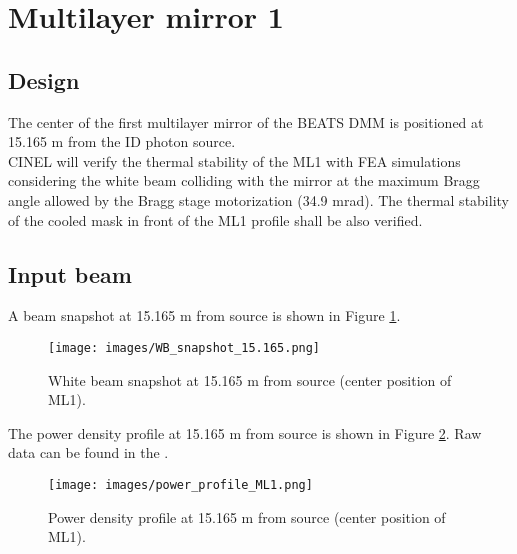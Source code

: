 \section{Multilayer mirror 1}
\subsection{Design}
The center of the first multilayer mirror of the BEATS DMM is positioned at 15.165 m from the ID photon source. \\
CINEL will verify the thermal stability of the ML1 with FEA simulations considering the white beam colliding with the mirror at the maximum Bragg angle allowed by the Bragg stage motorization (34.9 mrad). The thermal stability of the cooled mask in front of the ML1 profile shall be also verified.\\

\subsection{Input beam}
A beam snapshot at 15.165 m from source is shown in Figure \ref{fig:snapshot_ML1}.
\begin{figure}[ht]
\centering
\texttt{[image: images/WB\_snapshot\_15.165.png]}
\caption{\label{fig:snapshot_ML1} White beam snapshot at 15.165 m from source (center position of ML1).}
\end{figure}

The power density profile at 15.165 m from source is shown in Figure \ref{fig:power_profile_ML1}. Raw data can be found in the \powerprofilesurl. \\
\begin{figure}[ht]
\centering
\texttt{[image: images/power\_profile\_ML1.png]}
\caption{\label{fig:power_profile_ML1} Power density profile at 15.165 m from source (center position of ML1).}
\end{figure}